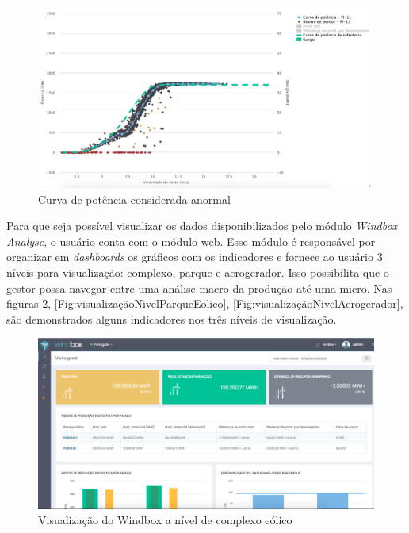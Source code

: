 \begin{figure}[htbp!] \begin{center}
\includegraphics[width=1\linewidth]{./figuras/curva-potencia-problema}
\caption{Curva de potência considerada anormal}
\label{Fig:curvaPotenciaProblema}
\end{center} 
\end{figure}

Para que seja possível visualizar os dados disponibilizados pelo módulo \textit{Windbox Analyse}, o usuário conta com o módulo web. Esse módulo é responsável por organizar em \textit{dashboards} os gráficos com os indicadores e fornece ao usuário 3 níveis para visualização: complexo, parque e aerogerador. Isso possibilita que o gestor possa navegar entre uma análise macro da produção até uma micro. Nas figuras \ref{Fig:visualizaçãoNivelComplexoEolico}, \ref{Fig:visualizaçãoNivelParqueEolico}, \ref{Fig:visualizaçãoNivelAerogerador}, são demonstrados alguns indicadores nos três níveis de visualização.

\begin{figure}[htbp!] \begin{center}
\includegraphics[width=1\linewidth]{./figuras/tela-complexo}
\caption{Visualização do Windbox a nível de complexo eólico}
\label{Fig:visualizaçãoNivelComplexoEolico}
\end{center} 
\end{figure}

